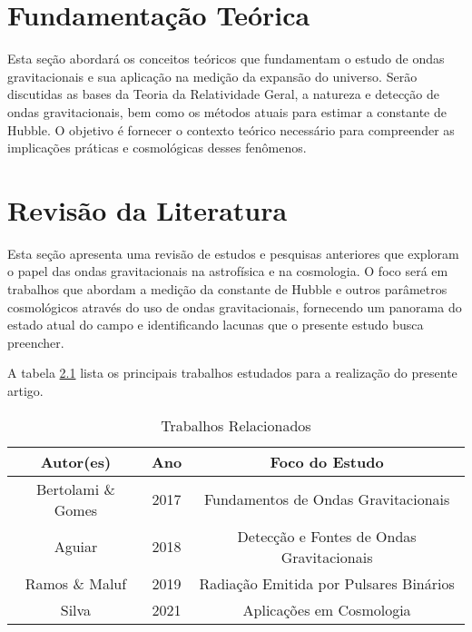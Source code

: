 \documentclass[12pt,oneside,a4paper,chapter=TITLE,section=TITLE,sumario
=tradicional]{abntex2}
\begin{document}
\chapter{Fundamentação Teórica}
\label{cap:fundamentacao-teorica}

Esta seção abordará os conceitos teóricos que fundamentam o estudo de ondas gravitacionais e sua aplicação na medição da expansão do universo. Serão discutidas as bases da Teoria da Relatividade Geral, a natureza e detecção de ondas gravitacionais, bem como os métodos atuais para estimar a constante de Hubble. O objetivo é fornecer o contexto teórico necessário para compreender as implicações práticas e cosmológicas desses fenômenos.

\chapter{Revisão da Literatura}
\label{cap:revisao-literatura}

Esta seção apresenta uma revisão de estudos e pesquisas anteriores que exploram o papel das ondas gravitacionais na astrofísica e na cosmologia. O foco será em trabalhos que abordam a medição da constante de Hubble e outros parâmetros cosmológicos através do uso de ondas gravitacionais, fornecendo um panorama do estado atual do campo e identificando lacunas que o presente estudo busca preencher.

A tabela \ref{table:related_work} lista os principais trabalhos estudados para a realização do presente artigo.

\begin{table}[h]
\centering
\caption{Trabalhos Relacionados}
\label{table:related_work}
\begin{tabular}{|c|c|c|}
\hline
Autor(es) & Ano & Foco do Estudo \\
\hline
Bertolami \& Gomes & 2017 & Fundamentos de Ondas Gravitacionais \\
\hline
Aguiar & 2018 & Detecção e Fontes de Ondas Gravitacionais \\
\hline
Ramos \& Maluf & 2019 & Radiação Emitida por Pulsares Binários \\
\hline
Silva & 2021 & Aplicações em Cosmologia \\
\hline
\end{tabular}
\end{table}
\end{document}
